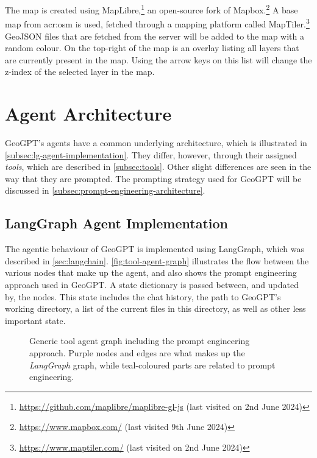 The map is created using MapLibre,\footnote{\url{https://github.com/maplibre/maplibre-gl-js} (last visited on 2nd June 2024)} an open-source fork of Mapbox.\footnote{\url{https://www.mapbox.com/} (last visited 9th June 2024)} A base map from \gls{acr:osm} is used, fetched through a mapping platform called MapTiler.\footnote{\url{https://www.maptiler.com/} (last visited on 2nd June 2024)} GeoJSON files that are fetched from the server will be added to the map with a random colour. On the top-right of the map is an overlay listing all layers that are currently present in the map. Using the arrow keys on this list will change the z-index of the selected layer in the map.


\section{Agent Architecture}
\label{sec:agent-architecture}

GeoGPT's agents have a common underlying architecture, which is illustrated in \autoref{subsec:lg-agent-implementation}. They differ, however, through their assigned \textit{tools}, which are described in \autoref{subsec:tools}. Other slight differences are seen in the way that they are prompted. The prompting strategy used for GeoGPT will be discussed in \autoref{subsec:prompt-engineering-architecture}.

\subsection{LangGraph Agent Implementation}
\label{subsec:lg-agent-implementation}

The agentic behaviour of GeoGPT is implemented using LangGraph, which was described in \autoref{sec:langchain}. \autoref{fig:tool-agent-graph} illustrates the flow between the various nodes that make up the agent, and also shows the prompt engineering approach used in GeoGPT. A state dictionary is passed between, and updated by, the nodes. This state includes the chat history, the path to GeoGPT's working directory, a list of the current files in this directory, as well as other less important state.


\begin{figure}
    \centering
    \caption[Generic tool agent graph including the prompt engineering approach]{Generic tool agent graph including the prompt engineering approach. Purple nodes and edges are what makes up the \textit{LangGraph} graph, while teal-coloured parts are related to prompt engineering.}
    \label{fig:tool-agent-graph}
\end{figure}

